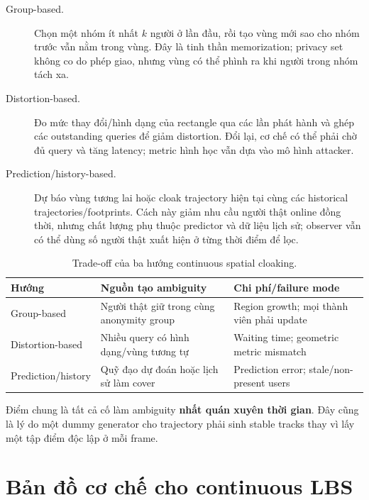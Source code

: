 \documentclass[11pt,a4paper,oneside]{report}
\begin{document}
\begin{description}
  \item[Group-based.] Chọn một nhóm ít nhất $k$ người ở lần đầu, rồi tạo vùng mới
  sao cho nhóm trước vẫn nằm trong vùng. Đây là tinh thần memorization; privacy set
  không co do phép giao, nhưng vùng có thể phình ra khi người trong nhóm tách xa.

  \item[Distortion-based.] Đo mức thay đổi/hình dạng của rectangle qua các lần phát
  hành và ghép các outstanding queries để giảm distortion. Đổi lại, cơ chế có thể
  phải chờ đủ query và tăng latency; metric hình học vẫn dựa vào mô hình attacker.

  \item[Prediction/history-based.] Dự báo vùng tương lai hoặc cloak trajectory hiện
  tại cùng các historical trajectories/footprints. Cách này giảm nhu cầu người thật
  online đồng thời, nhưng chất lượng phụ thuộc predictor và dữ liệu lịch sử; observer
  vẫn có thể dùng số người thật xuất hiện ở từng thời điểm để lọc.
\end{description}

\begin{table}[htbp]
\centering
\small
\caption{Trade-off của ba hướng continuous spatial cloaking.}
\label{tab:continuous-cloaking}
\begin{tabularx}{\textwidth}{P{3.0cm}Y Y}
\toprule
\textbf{Hướng} & \textbf{Nguồn tạo ambiguity} & \textbf{Chi phí/failure mode}\\
\midrule
Group-based & Người thật giữ trong cùng anonymity group & Region growth; mọi thành viên phải update\\
Distortion-based & Nhiều query có hình dạng/vùng tương tự & Waiting time; geometric metric mismatch\\
Prediction/history & Quỹ đạo dự đoán hoặc lịch sử làm cover & Prediction error; stale/non-present users\\
\bottomrule
\end{tabularx}
\end{table}

Điểm chung là tất cả cố làm ambiguity \textbf{nhất quán xuyên thời gian}. Đây cũng
là lý do một dummy generator cho trajectory phải sinh stable tracks thay vì lấy
một tập điểm độc lập ở mỗi frame.

\section{Bản đồ cơ chế cho continuous LBS}
\end{document}

